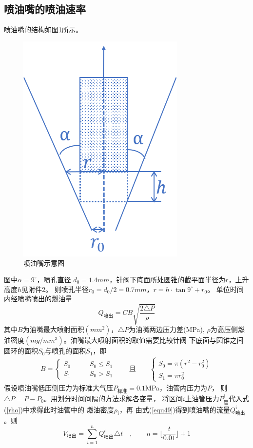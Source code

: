 \documentclass[withoutpreface,bwprint]{cumcmthesis} %
\begin{document}
\subsection{喷油嘴的喷油速率}
    喷油嘴的结构如图\ref{figure12}所示。
    \begin{figure}[htbp]
        \centering
        \includegraphics[width=.3\textwidth]{Pin.png}
        \caption{喷油嘴示意图}
        \label{figure12}
    \end{figure}
    图中$\alpha=9^\circ$，喷孔直径
    $d_0=1.4mm$，针阀下底面所处圆锥的截平面半径为$r$，上升高度$h$见附件2。
    则喷孔半径$r_0=d_0/2=0.7mm$，$r=h\cdot\tan 9^\circ + r_0$。
    单位时间内经喷嘴喷出的燃油量
    \begin{equation}
    Q_{\text{喷出}}=CB\sqrt{\frac{2 \triangle P}{\rho}}
    \label{equ49}
    \end{equation}
    其中$B$为油嘴最大喷射面积$(mm^2)$，$\triangle P$为油嘴两边压力差(MPa),
    $\rho$为高压侧燃油密度$(mg/mm^3)$。油嘴最大喷射面积的取值需要比较针阀
    下底面与圆锥之间圆环的面积$S_0$与喷孔的面积$S_1$，即
    \begin{eqnarray}
    B=
    \begin{cases}
        S_0 \quad \quad & S_0 \leq S_1 \\
        S_1    & S_0 > S_1
    \end{cases}
    \quad \quad
    \text{且}
    \quad \quad
    \begin{cases}
        S_0=\pi(r^2-r_0^2) \\
        S_1=\pi r_0^2
    \end{cases}
    \label{equ50}
    \end{eqnarray}
    假设喷油嘴低压侧压力为标准大气压$P_{\text{标准}}=0.1$MPa，油管内压力为$P$，
    则$\triangle P=P-P_0$。用{\color{red}划分时间间隔的方法求解各变量，}
    将区间$i$上油管压力$P_{\text{管}}^i$代入式(\ref{rho})中求得此时油管中的
    燃油密度$\rho_i$，再
    由式(\ref{equ49})得到喷油嘴的流量$Q_{\text{喷出}}^i$。则
    \begin{equation}
        V_{\text{喷出}}= \sum\limits_{i=1}^n Q_{\text{喷出}}^i\triangle t
        \quad , \quad \quad n={\lfloor{\frac{t}{0.01}}\rfloor+1}
    \label{equ51}
    \end{equation} 
\end{document}
